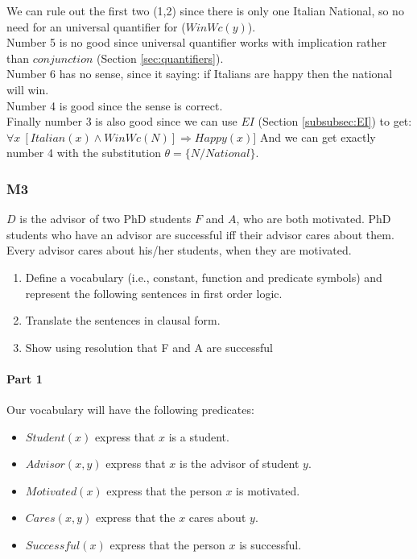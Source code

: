 \documentclass[10pt,a4paper]{article}
\begin{document}
\begin{itemize}
We can rule out the first two (1,2) since there is only one Italian National, so no need for an universal quantifier for ($WinWc(y)$).\\
Number 5 is no good since universal quantifier works with implication rather than $conjunction$ (Section \ref{sec:quantifiers}).\\
Number 6 has no sense, since it saying: if Italians are happy then the national will win.\\
Number 4 is good since the sense is correct.\\
Finally number 3 is also good since we can use $EI$ (Section \ref{subsubsec:EI}) to get:
$\forall x\ [Italian(x)\wedge WinWc(N)]\Rightarrow Happy(x)]$
And we can get exactly number 4 with the substitution $\theta=\{N/National\}$.

\subsubsection{M3}
$D$ is the advisor of two PhD students $F$ and $A$, who are both motivated. PhD students who have an advisor are successful iff their advisor cares about them. Every advisor cares about his/her students, when they are motivated.
\begin{enumerate}
\item Define a vocabulary (i.e., constant, function and predicate symbols) and represent the following sentences in first order logic.
\item Translate the sentences in clausal form.
\item Show using resolution that F and A are successful
\end{enumerate}


\paragraph{Part 1}

Our vocabulary will have the following predicates:
\begin{itemize}
\item $Student(x)$ express that $x$ is a student.
\item $Advisor(x,y)$ express that $x$ is the advisor of student $y$.
\item $Motivated(x)$ express that the person $x$ is motivated.
\item $Cares(x,y)$ express that the  $x$ cares about $y$.
\item $Successful(x)$ express that the person $x$ is successful.
\end{itemize}



\end{itemize}
\end{document}

